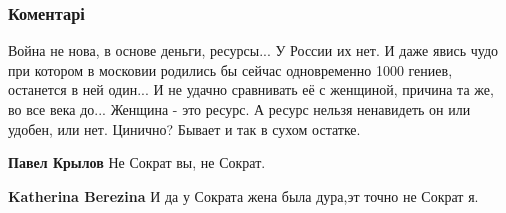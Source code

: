  
 
 
 
 
\subsubsection{Коментарі}
\label{sec:19_07_2021.fb.bilchenko_evgenia.1.infvojna.cmt}

\begin{itemize}
 

Война не нова, в основе деньги, ресурсы... У России их нет. И даже явись чудо при
котором в московии родились бы сейчас одновременно 1000 гениев, останется в ней
один... И не удачно сравнивать её с женщиной, причина та же, во все века
до... Женщина - это ресурс. А ресурс нельзя ненавидеть он или удобен, или
нет. Цинично? Бывает и так в сухом остатке.

\begin{itemize}
 
\textbf{Павел Крылов} Не Сократ вы, не Сократ.

 
\textbf{Katherina Berezina} И да у Сократа жена была дура,эт точно не Сократ я.

 

\end{itemize}
\end{itemize}
